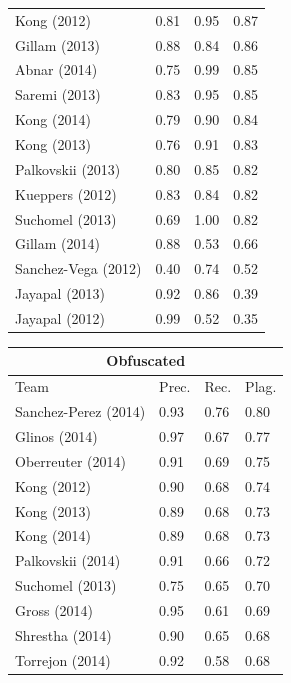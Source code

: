 \begin{table}[th]
\begin{tabularx}{.31\textwidth}{@{}l*{3}{X}}
Kong (2012)         &         0.81 &   0.95 &    0.87 \\
Gillam (2013)       &         0.88 &   0.84 &    0.86 \\
Abnar (2014)        &         0.75 &   0.99 &    0.85 \\
Saremi (2013)       &         0.83 &   0.95 &    0.85 \\
Kong (2014)         &         0.79 &   0.90 &    0.84 \\
Kong (2013)         &         0.76 &   0.91 &    0.83 \\
Palkovskii (2013)   &         0.80 &   0.85 &    0.82 \\
Kueppers (2012)     &         0.83 &   0.84 &    0.82 \\
Suchomel (2013)     &         0.69 &   1.00 &    0.82 \\
Gillam (2014)       &         0.88 &   0.53 &    0.66 \\
Sanchez-Vega (2012) &         0.40 &   0.74 &    0.52 \\
Jayapal (2013)      &         0.92 &   0.86 &    0.39 \\
Jayapal (2012)      &         0.99 &   0.52 &    0.35 \\
\bottomrule
\end{tabularx}
\hfill
\begin{tabularx}{.31\textwidth}{@{}l*{3}{X}}
\multicolumn{4}{c}{\bfseries Obfuscated} \\
\toprule
Team                & Prec.     & Rec.   & Plag.   \\
\midrule
Sanchez-Perez (2014)&       0.93 &   0.76 &    0.80 \\
Glinos (2014)       &       0.97 &   0.67 &    0.77 \\
Oberreuter (2014)   &       0.91 &   0.69 &    0.75 \\
Kong (2012)         &       0.90 &   0.68 &    0.74 \\
Kong (2013)         &       0.89 &   0.68 &    0.73 \\ %
Kong (2014)         &       0.89 &   0.68 &    0.73 \\ %
Palkovskii (2014)   &       0.91 &   0.66 &    0.72 \\
Suchomel (2013)     &       0.75 &   0.65 &    0.70 \\
Gross (2014)        &       0.95 &   0.61 &    0.69 \\
Shrestha (2014)     &       0.90 &   0.65 &    0.68 \\
Torrejon (2014)     &       0.92 &   0.58 &    0.68 \\

\end{tabularx}
\end{table}
